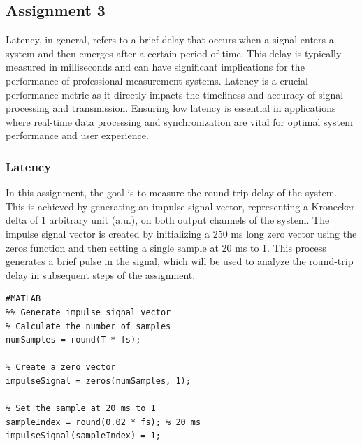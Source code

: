 \documentclass[
	a4paper,
	11pt,
]{article}
\begin{document}
\subsection{Assignment 3}
Latency, in general, refers to a brief delay that occurs when a signal enters a system and then emerges after a certain period of time. This delay is typically measured in milliseconds and can have significant implications for the performance of professional measurement systems. Latency is a crucial performance metric as it directly impacts the timeliness and accuracy of signal processing and transmission. Ensuring low latency is essential in applications where real-time data processing and synchronization are vital for optimal system performance and user experience.

\subsubsection{Latency}
In this assignment, the goal is to measure the round-trip delay of the system. This is achieved by generating an impulse signal vector, representing a Kronecker delta of 1 arbitrary unit (a.u.), on both output channels of the system. The impulse signal vector is created by initializing a 250 ms long zero vector using the zeros function and then setting a single sample at 20 ms to 1. This process generates a brief pulse in the signal, which will be used to analyze the round-trip delay in subsequent steps of the assignment.

\begin{verbatim}
#MATLAB
%% Generate impulse signal vector
% Calculate the number of samples
numSamples = round(T * fs);

% Create a zero vector
impulseSignal = zeros(numSamples, 1);

% Set the sample at 20 ms to 1
sampleIndex = round(0.02 * fs); % 20 ms
impulseSignal(sampleIndex) = 1;
\end{verbatim}
\end{document}
